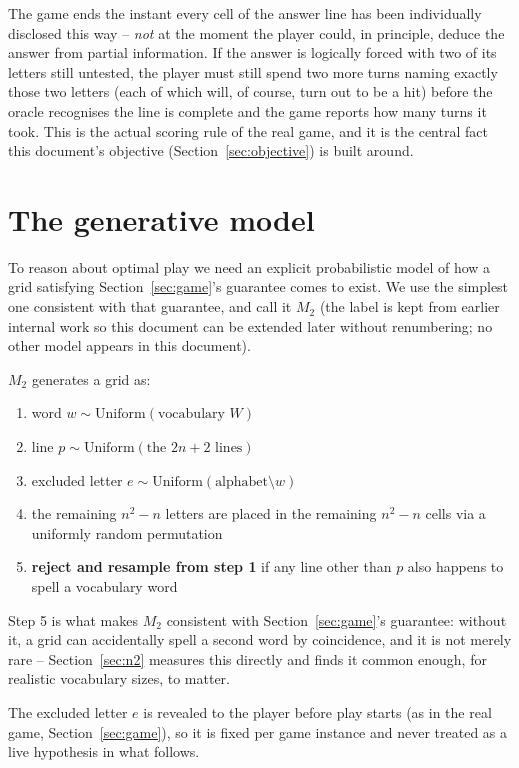 \documentclass[11pt]{article}
\begin{document}
The game ends the instant every cell of the answer line has been
individually disclosed this way -- \emph{not} at the moment the player
could, in principle, deduce the answer from partial information. If the
answer is logically forced with two of its letters still untested, the
player must still spend two more turns naming exactly those two letters
(each of which will, of course, turn out to be a hit) before the oracle
recognises the line is complete and the game reports how many turns it
took. This is the actual scoring rule of the real game, and it is the
central fact this document's objective (Section~\ref{sec:objective}) is
built around.

\section{The generative model}
\label{sec:model}

To reason about optimal play we need an explicit probabilistic model of
how a grid satisfying Section~\ref{sec:game}'s guarantee comes to exist.
We use the simplest one consistent with that guarantee, and call it
$M_2$ (the label is kept from earlier internal work so this document can
be extended later without renumbering; no other model appears in this
document).

$M_2$ generates a grid as:
\begin{enumerate}
  \item word $w \sim \mathrm{Uniform}(\text{vocabulary } W)$
  \item line $p \sim \mathrm{Uniform}(\text{the } 2n+2 \text{ lines})$
  \item excluded letter $e \sim \mathrm{Uniform}(\text{alphabet} \setminus w)$
  \item the remaining $n^2-n$ letters are placed in the remaining
  $n^2-n$ cells via a uniformly random permutation
  \item \textbf{reject and resample from step 1} if any line other than
  $p$ also happens to spell a vocabulary word
\end{enumerate}
Step 5 is what makes $M_2$ consistent with Section~\ref{sec:game}'s
guarantee: without it, a grid can accidentally spell a second word by
coincidence, and it is not merely rare -- Section~\ref{sec:n2} measures
this directly and finds it common enough, for realistic vocabulary
sizes, to matter.

The excluded letter $e$ is revealed to the player before play starts (as
in the real game, Section~\ref{sec:game}), so it is fixed per game
instance and never treated as a live hypothesis in what follows.
\end{document}

